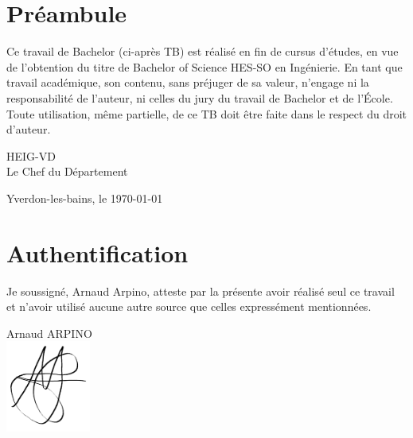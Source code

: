 \clearpage
\null
\thispagestyle{empty}
\clearpage

\vspace*{4cm}
\section*{\Huge Préambule}

\vspace{1cm}
Ce travail de Bachelor (ci-après TB) est réalisé en fin de cursus d'études, en vue de
l'obtention du titre de Bachelor of Science HES-SO en Ingénierie.
En tant que travail académique, son contenu, sans préjuger de sa valeur, n'engage
ni la responsabilité de l'auteur, ni celles du jury du travail de Bachelor et de l'École.
Toute utilisation, même partielle, de ce TB doit être faite dans le respect du droit
d'auteur.

\vspace{2cm}

\hspace*{10cm}
\begin{minipage}{0.3\textwidth}
    HEIG-VD\\
    Le Chef du Département
\end{minipage}

\vspace{5cm}
Yverdon-les-bains, le \today

\clearpage
\null
\thispagestyle{empty}
\clearpage
\newpage

\vspace*{4cm}
\section*{\Huge Authentification}

\vspace{2cm}
Je soussigné, Arnaud Arpino, atteste par la présente avoir réalisé seul ce travail et
n'avoir utilisé aucune autre source que celles expressément mentionnées.

\vspace{2cm}

\hspace*{10cm}
\begin{minipage}{0.3\textwidth}
    Arnaud ARPINO\\
    \includegraphics[height=3cm]{Images/Signatures/signature Arnaud.png}
\end{minipage}

